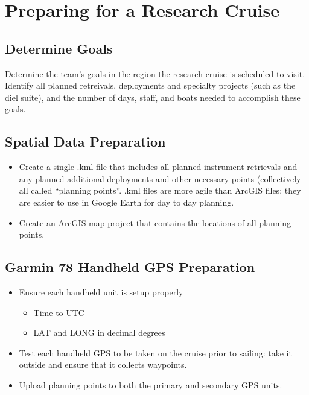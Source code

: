\documentclass[]{book}
\providecommand{\tightlist}{%
  \setlength{\itemsep}{0pt}\setlength{\parskip}{0pt}}
\begin{document}
\hypertarget{cruise_prep}{%
\chapter{Preparing for a Research Cruise}\label{cruise_prep}}

\hypertarget{determine-goals}{%
\section{Determine Goals}\label{determine-goals}}

Determine the team's goals in the region the research cruise is scheduled to visit. Identify all planned retreivals, deployments and specialty projects (such as the diel suite), and the number of days, staff, and boats needed to accomplish these goals.

\hypertarget{spatial-data-preparation}{%
\section{Spatial Data Preparation}\label{spatial-data-preparation}}

\begin{itemize}
\tightlist
\item
  Create a single .kml file that includes all planned instrument retrievals and any planned additional deployments and other necessary points (collectively all called ``planning points''. .kml files are more agile than ArcGIS files; they are easier to use in Google Earth for day to day planning.
\item
  Create an ArcGIS map project that contains the locations of all planning points.
\end{itemize}

\hypertarget{garmin-78-handheld-gps-preparation}{%
\section{Garmin 78 Handheld GPS Preparation}\label{garmin-78-handheld-gps-preparation}}

\begin{itemize}
\tightlist
\item
  Ensure each handheld unit is setup properly

  \begin{itemize}
  \tightlist
  \item
    Time to UTC
  \item
    LAT and LONG in decimal degrees
  \end{itemize}
\item
  Test each handheld GPS to be taken on the cruise prior to sailing: take it outside and ensure that it collects waypoints.
\item
  Upload planning points to both the primary and secondary GPS units.
\end{itemize}
\end{document}

